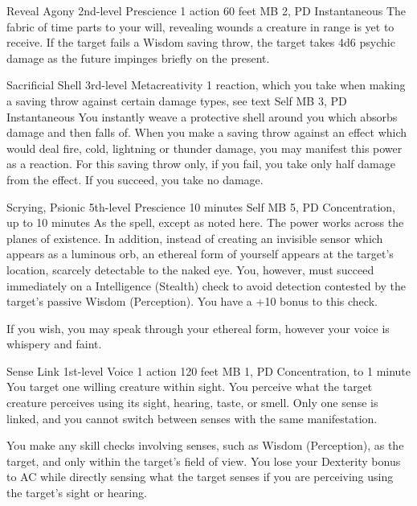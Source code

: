 \DndPowerHeader%
  {Reveal Agony}
  {2nd-level Prescience}
  {1 action}
  {60 feet}
  {MB 2, PD \lvltwo}
  {Instantaneous}
The fabric of time parts to your will,
revealing wounds a creature in range is yet to receive.
If the target fails a Wisdom saving throw,
the target takes 4d6 psychic damage as the future
impinges briefly on the present.

\DndPowerHeader%
  {Sacrificial Shell}
  {3rd-level Metacreativity}
  {1 reaction, which you take when making a saving throw against certain damage types, see text}
  {Self}
  {MB 3, PD \lvlthree}
  {Instantaneous}
You instantly weave a protective shell around you
which absorbs damage and then falls of.
When you make a saving throw against an effect
which would deal fire, cold, lightning or thunder damage,
you may manifest this power as a reaction.
For this saving throw only,
if you fail, you take only half damage from the effect.
If you succeed, you take no damage.

\DndPowerHeader%
  {Scrying, Psionic}
  {5th-level Prescience}
  {10 minutes}
  {Self}
  {MB 5, PD \lvlfive}
  {Concentration, up to 10 minutes}
As the  spell, except as noted here.
The power works across the planes of existence.
In addition,
instead of creating an invisible sensor which appears
as a luminous orb,
an ethereal form of yourself appears at the target's location,
scarcely detectable to the naked eye.
You,
however,
must succeed immediately on a Intelligence (Stealth) check
to avoid detection contested by the target's passive
Wisdom (Perception).
You have a +10 bonus to this check.

If you wish,
you may speak through your ethereal form,
however your voice is whispery and faint.

\DndPowerHeader%
  {Sense Link}
  {1st-level Voice}
  {1 action}
  {120 feet}
  {MB 1, PD \lvlone}
  {Concentration, to 1 minute}
You target one willing creature within sight.
You perceive what the target creature perceives using its sight,
hearing, taste, or smell.
Only one sense is linked,
and you cannot switch between senses with the same manifestation.

You make any skill checks involving senses,
such as Wisdom (Perception), as the target,
and only within the target's field of view.
You lose your Dexterity bonus to AC while
directly sensing what the target senses
if you are perceiving using the target's sight or hearing.

